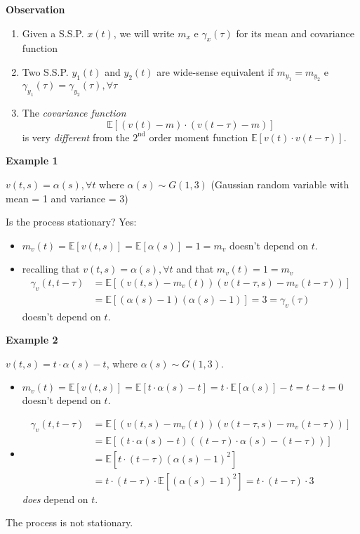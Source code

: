
\textbf{Observation}
\begin{enumerate}
	\item Given a S.S.P. $x(t)$, we will write $m_{x}$ e $\gamma_{x}(\tau)$ for its mean and covariance function
	\item Two S.S.P. $y_{1}(t)$ and $y_{2}(t)$ are wide-sense equivalent if $m_{y_{1}}=m_{y_{2}}$ e $\gamma_{y_{1}}(\tau)=\gamma_{y_{2}}(\tau), \forall \tau$
	\item The \emph{covariance function}
	$$
		\mathbb{E}[(v(t)-m) \cdot(v(t-\tau)-m)]
	$$
	is very \emph{different} from the $2^{\text{nd}}$ order moment function $\mathbb{E}[v(t) \cdot v(t-\tau)]$.
\end{enumerate}

\textbf{Example 1}

$v(t,s)=\alpha (s),\forall t$ where $\alpha (s)\sim G(1,3)$ (Gaussian random variable with mean = 1 and variance = 3)

Is the process stationary? Yes:
\begin{itemize}
	\item $m_{v}(t)=\mathbb{E}[v(t, s)]=\mathbb{E}[\alpha(s)]=1=m_{v}$ doesn't depend on $t$.
	\item recalling that $v(t, s)=\alpha(s), \forall t$ and that $m_{v}(t)=1=m_{v}$
	\begin{align*}
		\gamma_{v}(t, t-\tau)&=\mathbb{E}[(v(t, s)-m_{v}(t))(v(t-\tau, s)-m_{v}(t-\tau))]\\
		&=\mathbb{E}[(\alpha(s)-1)(\alpha(s)-1)]=3=\gamma_{v}(\tau)
	\end{align*}
	 doesn't depend on $t$.
\end{itemize}

\textbf{Example 2}

$v(t, s)=t \cdot \alpha(s)-t$, where $\alpha(s) \sim G(1,3)$.
\begin{itemize}
	\item $m_{v}(t)=\mathbb{E}[v(t, s)]=\mathbb{E}[t \cdot \alpha(s)-t]=t \cdot \mathbb{E}[\alpha(s)]-t=t-t=0$ doesn't depend on $t$.
	\item \begin{align*}
		\gamma_{v}(t, t-\tau)&=\mathbb{E}[(v(t, s)-m_{v}(t))(v(t-\tau, s)-m_{v}(t-\tau))]\\
	&=\mathbb{E}[(t \cdot \alpha(s)-t)((t-\tau) \cdot \alpha(s)-(t-\tau))]\\
	&=\mathbb{E}[t \cdot(t-\tau)(\alpha(s)-1)^{2}]\\
	&=t \cdot(t-\tau) \cdot \mathbb{E}[(\alpha(s)-1)^{2}]=t \cdot(t-\tau) \cdot 3
	\end{align*}
	\emph{does} depend on $t$.
\end{itemize}
The process is not stationary.

